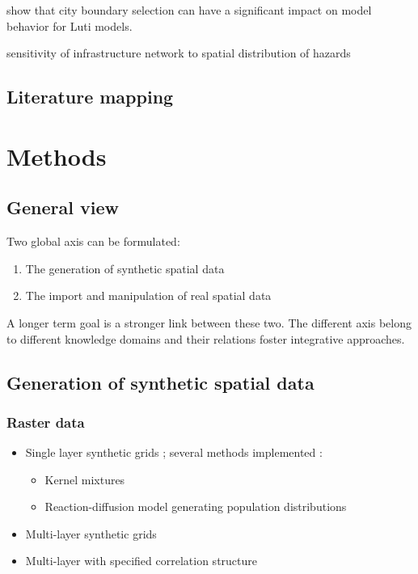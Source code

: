 \cite{Thomasetal2017} show that city boundary selection can have a significant impact on model behavior for Luti models.

\cite{moderl2011spatial} sensitivity of infrastructure network to spatial distribution of hazards






\subsection{Literature mapping}

%





\section{Methods}


\subsection{General view}

Two global axis can be formulated:

\begin{enumerate}
	\item The generation of synthetic spatial data
	\item The import and manipulation of real spatial data 
\end{enumerate}

A longer term goal is a stronger link between these two. The different axis belong to different knowledge domains \cite{raimbault2017applied} and their relations foster integrative approaches.



\subsection{Generation of synthetic spatial data}


\subsubsection{Raster data}

\begin{itemize}
	\item Single layer synthetic grids ; several methods implemented :
		\begin{itemize}
			\item Kernel mixtures \cite{anas1998urban}
			\item Reaction-diffusion model generating population distributions \cite{raimbault2018calibration}
		\end{itemize}
	\item Multi-layer synthetic grids
	\item Multi-layer with specified correlation structure
\end{itemize}


